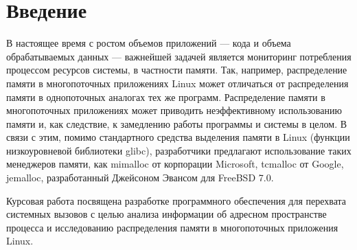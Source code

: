 \chapter*{Введение}

В настоящее время с ростом объемов приложений --- кода и объема обрабатываемых данных --- важнейшей задачей является мониторинг потребления процессом ресурсов системы, в частности памяти. Так, например, распределение памяти в многопоточных приложениях Linux может отличаться от распределения памяти в однопоточных аналогах тех же программ. Распределение памяти в многопоточных приложениях может приводить неэффективному использованию памяти и, как следствие, к замедлению работы программы и системы в целом. В связи с этим, помимо стандартного средства выделения памяти в Linux (функции  низкоуровневой библиотеки glibc), разработчики предлагают использование таких менеджеров памяти, как mimalloc от корпорации Microsoft, tcmalloc от Google, jemalloc, разработанный Джейсоном Эвансом для FreeBSD 7.0.

Курсовая работа посвящена разработке программного обеспечения для перехвата системных вызовов с целью анализа информации об адресном пространстве процесса и исследованию распределения памяти в многопоточных приложения Linux.